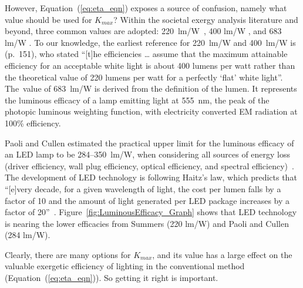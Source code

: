 \documentclass[energies,article,accept,moreauthors,pdftex]{Definitions/mdpi}\usepackage[]{graphicx}\usepackage[]{color}
\newcommand{\del}[1]{}
\newcommand{\ins}[1]{#1}
\newcommand{\rev}[2]{#2}
\providecommand{\DIFdelbegin}{} %
\providecommand{\DIFdelend}{} %
\newcommand{\DIFscaledelfig}{0.5}
\newlength{\DIFdelgraphicswidth} %
\newlength{\DIFdelgraphicsheight} %
\newcommand{\DIFdelincludegraphics}[2][]{%
\sbox{\DIFdelgraphicsbox}{\DIFOincludegraphics[#1]{#2}}%
\settoboxwidth{\DIFdelgraphicswidth}{\DIFdelgraphicsbox} %
\settoboxtotalheight{\DIFdelgraphicsheight}{\DIFdelgraphicsbox} %
\scalebox{\DIFscaledelfig}{%
\parbox[b]{\DIFdelgraphicswidth}{\usebox{\DIFdelgraphicsbox}\\[-\baselineskip] \rule{\DIFdelgraphicswidth}{0em}}\llap{\resizebox{\DIFdelgraphicswidth}{\DIFdelgraphicsheight}{%
\setlength{\unitlength}{\DIFdelgraphicswidth}%
\begin{picture}(1,1)%
\thicklines\linethickness{2pt} %
{\color[rgb]{1,0,0}\put(0,0){\framebox(1,1){}}}%
{\color[rgb]{1,0,0}\put(0,0){\line( 1,1){1}}}%
{\color[rgb]{1,0,0}\put(0,1){\line(1,-1){1}}}%
\end{picture}%
}\hspace*{3pt}}} %
} %
\DeclareRobustCommand{\DIFdelbegin}{\DIFOdelbegin \let\includegraphics\DIFdelincludegraphics} %
\DeclareRobustCommand{\DIFdelend}{\DIFOaddend \let\includegraphics\DIFOincludegraphics} %
\begin{document}
However, Equation~(\ref{eq:eta_eqn}) exposes 
a source of confusion, 
namely what value should be used for $K_{max}$?
Within the societal exergy analysis literature and beyond, 
three common values are adopted: 
\mbox{220~lm/W \cite{Summers1971, Ayres2003, USDepartmentofEnergyDoE2011}},
400 lm/W \cite{Summers1971, Ayres2005, Tsao2010solidstate, Guevara2016}, and
683 lm/W \cite{Kondo2009, Serrenho2014}.
To our knowledge, 
the earliest reference for 220~lm/W and 400~lm/W is 
\citet{Summers1971} (p.~151),
who stated ``[t]he efficiencies \ldots{} assume that the maximum attainable efficiency
for an acceptable white light is about
400 lumens per watt rather than the theoretical value 
of 220 lumens per watt 
for a perfectly `flat' white light''.
\mbox{The value} of 683~lm/W is  %
derived from the definition of the lumen. 
It represents the luminous efficacy of a lamp 
emitting light at 555~nm, the peak of the photopic luminous weighting function, 
with electricity converted EM radiation at 100\% efficiency.


Paoli and Cullen
estimated the practical upper limit for the luminous efficacy of an LED lamp to be 284--350~lm/W,
when considering all  %
sources  of energy loss
\DIFdelbegin %
(driver efficiency, wall plug efficiency, optical efficiency, and spectral efficiency)~\citep{Paoli2020}.
The development of LED technology is following Haitz's law, 
which predicts that ``[e]very decade, for a given wavelength of light, 
the cost per lumen falls by a factor of 10 
and the amount of light generated per LED package increases 
by a factor of 20''~\citep{haitz1999case, graydon2007haitz}.
Figure~\ref{fig:LuminousEfficacy_Graph} shows that 
LED technology is nearing  the 
lower efficacies from Summers (220 lm/W) and
Paoli and Cullen (284 lm/W).
\DIFdelbegin %
\DIFdelend 

Clearly, there are many options for $K_{max}$, and
its value has a large effect on the valuable exergetic efficiency of lighting
in the conventional method (Equation~(\ref{eq:eta_eqn})).
So getting it right is important.
\end{document}
